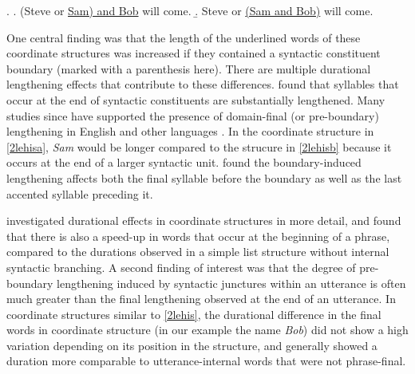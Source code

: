 \documentclass[preprint,review,12pt,authoryear,times]{elsarticle}
\begin{document}
\ex.\label{2lehis}
\a. (Steve or \underline{Sam) and Bob} will come.\label{2lehisa}
\b.  Steve or \underline{(Sam and Bob)} will come.\label{2lehisb}

\noindent One central finding was that the length of the underlined words of these coordinate structures was increased if they contained a syntactic constituent boundary (marked with a parenthesis here).  There are multiple durational lengthening effects that contribute to these differences. \citet{klatt75} found that syllables that occur at the end of syntactic constituents are substantially lengthened.  Many studies since have supported the presence of domain-final (or pre-boundary) lengthening in English and other languages \citep{wight92, price91,shatt96,byrd98,cho01,byrd03,cho16}. In the coordinate structure in \ref{2lehisa}, {\em Sam} would be longer compared to the strucure in \ref{2lehisb} because it occurs at the end of a larger syntactic unit. \citet{turk07} found the boundary-induced lengthening affects both the final syllable before the boundary as well as the last accented syllable preceding it. 

 \citet{wagner05recursion} investigated durational effects in coordinate structures in more detail, and found that there is also a speed-up in words that occur at the beginning of a phrase, compared to the durations observed in a simple list structure without internal syntactic branching. A second finding of interest was that the degree of pre-boundary lengthening induced by syntactic junctures within an utterance is often much greater than the final lengthening observed at the end of an utterance. In coordinate structures similar to \ref{2lehis},  the durational difference in the final words in coordinate structure (in our example the name {\em Bob}) did not show a high variation depending on its position in the structure, and generally showed a duration more comparable to utterance-internal words that were not phrase-final. 
 
\end{document}
